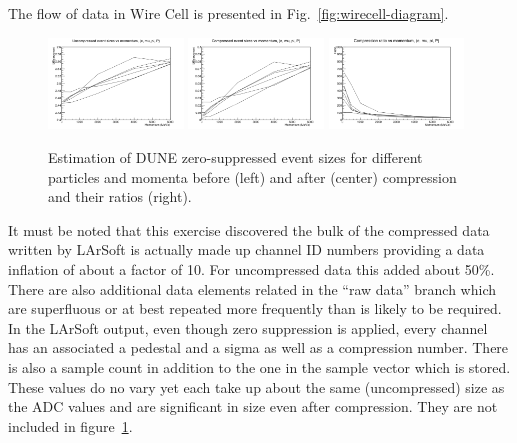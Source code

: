 The flow of data in Wire Cell is presented in Fig.~\ref{fig:wirecell-diagram}.
\begin{figure}
	\includegraphics[width=0.32\textwidth]{btot.png}
	\includegraphics[width=0.32\textwidth]{bzip.png}
	\includegraphics[width=0.32\textwidth]{brat.png}
	\caption{Estimation of DUNE zero-suppressed event sizes for different particles and momenta before (left) and after (center)  compression and their ratios (right).}
	\label{fig:data-compression}
\end{figure}




It must be noted that this exercise discovered the bulk of the
compressed data written by LArSoft is actually made up channel ID
numbers providing a data inflation of about a factor of 10.
For uncompressed data this added about 50\%.
There are also additional data elements related in the ``raw data''
branch which are superfluous or at best repeated more frequently than
is likely to be required.
In the LArSoft output, even though zero suppression is applied, every
channel has an associated a pedestal and a sigma as well as a
compression number.
There is also a sample count in addition to the one in the sample
vector which is stored.
These values do no vary yet each take up about the same (uncompressed)
size as the ADC values and are significant in size even after
compression.
They are not included in figure~\ref{fig:data-compression}.

